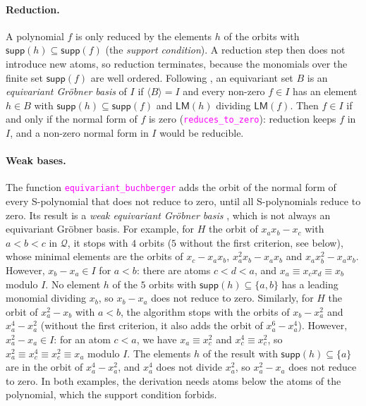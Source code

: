 \documentclass[12pt,a4paper,article]{memoir}
\newcommand{\dloQ}{\mathcal{Q}}
\newcommand{\idGen}[1]{\langle#1\rangle}
\newcommand{\emphdef}[1]{\emph{\textcolor{BrickRed}{#1}}}
\newcommand{\code}[1]{\texttt{\textcolor{magenta}{#1}}}
\theoremstyle{definition}
\begin{document}
\paragraph{Reduction.}
A polynomial $f$ is only reduced by the elements $h$ of the orbits with $\mathsf{supp}(h) \subseteq \mathsf{supp}(f)$
(the \emphdef{support condition}).
A reduction step then does not introduce new atoms,
so reduction terminates, because the monomials over the finite set $\mathsf{supp}(f)$ are well ordered.
Following \cite{GL25}, an equivariant set $B$ is an \emphdef{equivariant Gr\"{o}bner basis} of $I$
if $\idGen{B} = I$ and every non-zero $f \in I$ has an element $h \in B$
with $\mathsf{supp}(h) \subseteq \mathsf{supp}(f)$ and $\mathsf{LM}(h)$ dividing $\mathsf{LM}(f)$.
Then $f \in I$ if and only if the normal form of $f$ is zero (\code{reduces\_to\_zero}):
reduction keeps $f$ in $I$, and a non-zero normal form in $I$ would be reducible.

\paragraph{Weak bases.}
The function \code{equivariant\_buchberger} adds the orbit of the normal form of every S-polynomial
that does not reduce to zero, until all S-polynomials reduce to zero.
Its result is a \emphdef{weak equivariant Gr\"{o}bner basis} \cite[Lemma 24]{GL25},
which is not always an equivariant Gr\"{o}bner basis.
For example, for $H$ the orbit of $x_a x_b - x_c$ with $a < b < c$ in $\dloQ$,
it stops with $4$ orbits ($5$ without the first criterion, see below), whose minimal elements are the orbits of
$x_c - x_a x_b$, $x_a^2 x_b - x_a x_b$ and $x_a x_b^2 - x_a x_b$.
However, $x_b - x_a \in I$ for $a < b$:
there are atoms $c < d < a$, and $x_a \equiv x_c x_d \equiv x_b$ modulo $I$.
No element $h$ of the $5$ orbits with $\mathsf{supp}(h) \subseteq \{a, b\}$
has a leading monomial dividing $x_b$, so $x_b - x_a$ does not reduce to zero.
Similarly, for $H$ the orbit of $x_a^2 - x_b$ with $a < b$,
the algorithm stops with the orbits of $x_b - x_a^2$ and $x_a^4 - x_a^2$
(without the first criterion, it also adds the orbit of $x_a^6 - x_a^4$).
However, $x_a^2 - x_a \in I$:
for an atom $c < a$, we have $x_a \equiv x_c^2$ and $x_c^4 \equiv x_c^2$,
so $x_a^2 \equiv x_c^4 \equiv x_c^2 \equiv x_a$ modulo $I$.
The elements $h$ of the result with $\mathsf{supp}(h) \subseteq \{a\}$
are in the orbit of $x_a^4 - x_a^2$,
and $x_a^4$ does not divide $x_a^2$,
so $x_a^2 - x_a$ does not reduce to zero.
In both examples, the derivation needs atoms below the atoms of the polynomial,
which the support condition forbids.
\end{document}
